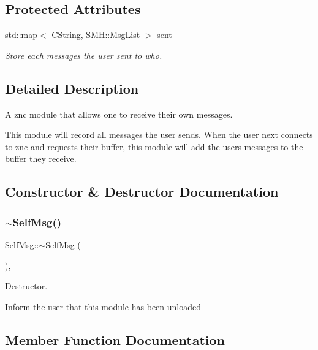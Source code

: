 \subsection*{Protected Attributes}
\begin{DoxyCompactItemize}
\item 
std\+::map$<$ C\+String, \hyperlink{namespace_s_m_h_a577a58a147f501590720badab28c2c98}{S\+M\+H\+::\+Msg\+List} $>$ \hyperlink{class_self_msg_ae2dc542caa1a3f5ae45e6de96d37cb22}{sent}
\begin{DoxyCompactList}\small\item\em Store each messages the user sent to who. \end{DoxyCompactList}\end{DoxyCompactItemize}


\subsection{Detailed Description}
A znc module that allows one to receive their own messages. 

This module will record all messages the user sends. When the user next connects to znc and requests their buffer, this module will add the user\textquotesingle{}s messages to the buffer they receive. 

\subsection{Constructor \& Destructor Documentation}
\mbox{\label{class_self_msg_a7febe41f96890d89051a91840da84fab}} 
\subsubsection{\texorpdfstring{$\sim$\+Self\+Msg()}{~SelfMsg()}}
{\footnotesize\ttfamily Self\+Msg\+::$\sim$\+Self\+Msg (\begin{DoxyParamCaption}{ }\end{DoxyParamCaption})\hspace{0.3cm}{\ttfamily [inline]}, {\ttfamily [override]}}



Destructor. 

Inform the user that this module has been unloaded 

\subsection{Member Function Documentation}
\mbox{\label{class_self_msg_a7eb533ec01cd81c8907fcf3a0ebd078e}} 
